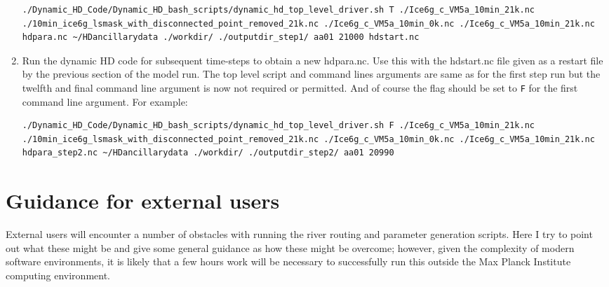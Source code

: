 \documentclass{article}
\begin{document}
\begin{enumerate}
\begin{lstlisting}[style=bash_input,breaklines=true]
./Dynamic_HD_Code/Dynamic_HD_bash_scripts/dynamic_hd_top_level_driver.sh T ./Ice6g_c_VM5a_10min_21k.nc ./10min_ice6g_lsmask_with_disconnected_point_removed_21k.nc ./Ice6g_c_VM5a_10min_0k.nc ./Ice6g_c_VM5a_10min_21k.nc hdpara.nc ~/HDancillarydata ./workdir/ ./outputdir_step1/ aa01 21000 hdstart.nc
\end{lstlisting}
\item Run the dynamic HD code for subsequent time-steps to obtain a new hdpara.nc. Use this with the hdstart.nc file given as a restart file by the previous section of the model run. The top level script and command lines arguments are same as for the first step run but the twelfth and final command line argument is now not required or permitted. And of course the flag should be set to \texttt{F} for the first command line argument. For example:
\begin{lstlisting}[style=bash_input,breaklines=true]
./Dynamic_HD_Code/Dynamic_HD_bash_scripts/dynamic_hd_top_level_driver.sh F ./Ice6g_c_VM5a_10min_21k.nc ./10min_ice6g_lsmask_with_disconnected_point_removed_21k.nc ./Ice6g_c_VM5a_10min_0k.nc ./Ice6g_c_VM5a_10min_21k.nc hdpara_step2.nc ~/HDancillarydata ./workdir/ ./outputdir_step2/ aa01 20990
\end{lstlisting}
\end{enumerate}
\section{Guidance for external users} \label{section-external-instructions}

External users will encounter a number of obstacles with running the river routing and parameter generation scripts. Here I try to point out what these might be and give some general guidance as how these might be overcome; however, given the complexity of modern software environments, it is likely that a few hours work will be necessary to successfully run this outside the Max Planck Institute computing environment.
\end{document}
